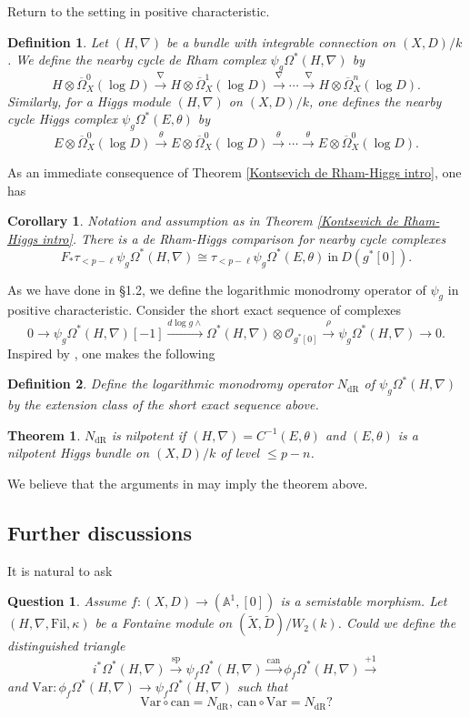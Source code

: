 \documentclass[12pt, a4paper]{article}
\newtheorem{definition}{Definition}[section]
\newtheorem{question}{Question}[section]
\newtheorem{theorem}{Theorem}[section]
\newtheorem{corollary}{Corollary}[section]
\begin{document}
Return to the setting in positive characteristic.
\begin{definition}
Let $(H,\nabla)$ be a bundle with integrable connection on $(X,D)/k$. We define the nearby cycle de Rham complex $\psi_g\Omega^*(H,\nabla)$ by
$$
H\otimes\overline{\Omega}^0_X(\log D)\xrightarrow{\nabla}H\otimes\overline{\Omega}^1_X(\log D)\xrightarrow{\nabla}\cdots\xrightarrow{\nabla}H\otimes\overline{\Omega}^n_X(\log D).
$$
Similarly, for a Higgs module $(H,\nabla)$ on $(X,D)/k$, one defines the nearby cycle Higgs complex $\psi_g\Omega^*(E,\theta)$ by
$$
E\otimes\overline{\Omega}^0_X(\log D)\xrightarrow{\theta}E\otimes\overline{\Omega}^0_X(\log D)\xrightarrow{\theta}\cdots\xrightarrow{\theta}E\otimes\overline{\Omega}^0_X(\log D).
$$


\end{definition}
As an immediate consequence of Theorem \ref{Kontsevich de Rham-Higgs intro}, one has
\begin{corollary}
Notation and assumption as in Theorem \ref{Kontsevich de Rham-Higgs intro}. There is a de Rham-Higgs comparison for nearby cycle complexes
$$
F_*\tau_{<p-\ell}\psi_g\Omega^*(H,\nabla)\cong\tau_{<p-\ell}\psi_g\Omega^*(E,\theta)~\mathrm{in}~D(g^*[0]).
$$
\end{corollary}
As we have done in \S1.2, we define the logarithmic monodromy operator of $\psi_g$ in positive characteristic. Consider the short exact sequence of complexes
$$
0\to\psi_g\Omega^*(H,\nabla)[-1]\xrightarrow{d\log g\wedge}\Omega^*(H,\nabla)\otimes\mathcal O_{g^*[0]}\xrightarrow{\rho}\psi_g\Omega^*(H,\nabla)\to0.
$$
Inspired by \cite[\S11.2.4]{CP}, one makes the following
\begin{definition}
Define the logarithmic monodromy operator $N_\mathrm{dR}$ of $\psi_g\Omega^*(H,\nabla)$ by the extension class of the short exact sequence above.
\end{definition}
\begin{theorem}
$N_\mathrm{dR}$ is nilpotent if $(H,\nabla)=C^{-1}(E,\theta)$ and $(E,\theta)$ is a nilpotent Higgs bundle on $(X,D)/k$ of level $\leq p-n$.
\end{theorem}
We believe that the arguments in \cite[\S3.1-3.2]{OV} may imply the theorem above.
\subsection{Further discussions}
It is natural to ask
\begin{question}
Assume $f:(X,D)\to(\mathbb A^1,[0])$ is a semistable morphism. Let $(H,\nabla,\mathrm{Fil},\kappa)$ be a Fontaine module on $(\tilde X,\tilde D)/W_2(k)$.
Could we define the distinguished triangle 
$$
i^*\Omega^*(H,\nabla)\xrightarrow{\mathrm{sp}}\psi_f\Omega^*(H,\nabla)\xrightarrow{\mathrm{can}}\phi_f\Omega^*(H,\nabla)\xrightarrow{+1}
$$
and $\mathrm{Var}:\phi_f\Omega^*(H,\nabla)\to\psi_f\Omega^*(H,\nabla)$ such that
$$
\mathrm{Var}\circ\mathrm{can}=N_\mathrm{dR},~\mathrm{can}\circ\mathrm{Var}=N_\mathrm{dR}?
$$
\end{question}
\fi
\end{document}
